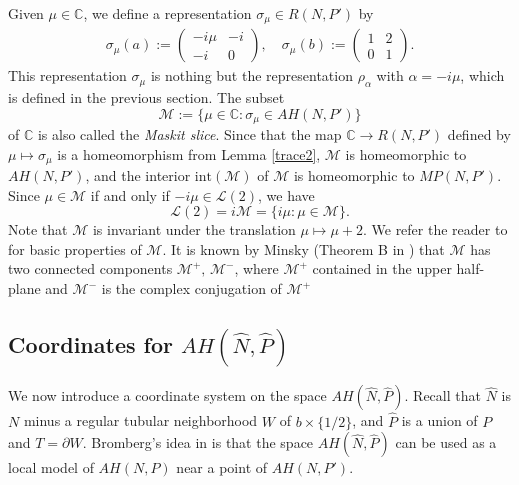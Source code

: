 \documentclass[12pt]{article}
\theoremstyle{plain}
\theoremstyle{definition}
\theoremstyle{remark}
\newcommand{\C}{\mathbb C}
\newcommand{\M}{\mathcal M}
\newcommand{\LL}{\mathcal L}
\newcommand{\hN}{{\hat N}}
\newcommand{\hP}{{\hat P}}
\newcommand{\alp}{\alpha}
\newcommand{\bd}{\partial}
\newcommand{\inte}{\mathrm{int}}
\begin{document}
Given $\mu \in \C$,  we define a representation $\sigma_\mu  \in R(N,P')$ by 
\begin{eqnarray*}
 \sigma_{\mu}(a):=\left(\begin{array}{cc}
 -i\mu & -i \\ 
-i & 
0 \end{array}\right), \quad 
\sigma_{\mu}(b):=\left(\begin{array}{cc}
  1& 2 \\ 
0 & 1
 \end{array}\right). 
\end{eqnarray*}
This representation $\sigma_\mu$ is nothing but the representation $\rho_\alp$ with $\alp=-i\mu$,  
which is defined in the previous section. 
The subset 
$$
\M:=\{\mu \in \C : \sigma_\mu \in AH(N,P')\} 
$$
of $\C$ is also called the {\it Maskit slice}. 
Since  that the map 
$\C \to R(N,P')$ defined by $\mu \mapsto \sigma_\mu$ is a homeomorphism from Lemma \ref{trace2}, 
$\M$ is homeomorphic to $AH(N,P')$, and 
the interior $\inte(\M)$ of $\M$ is homeomorphic to $MP(N,P')$.  
Since $\mu \in \M$ if and only if $-i\mu \in \LL(2)$, we have  
$$
\LL(2)=i\M=\{i \mu : \mu \in \M\}.
$$
Note that  $\M$ is invariant under the translation $\mu \mapsto \mu+2$. 
We refer the reader to \cite{KS} for basic properties of $\M$. 
It is known by Minsky (Theorem B in \cite{Mi}) that $\M$
has two connected components $\M^+, \,\M^-$, 
where $\M^+$ contained in the upper half-plane and $\M^-$ is the complex conjugation of $\M^+$ 




\subsection{Coordinates for $AH(\hN,\hP)$}

We now introduce a coordinate system on the space $AH(\hN,\hP)$. 
Recall that  
$\hat N$ is $N$ minus a regular tubular neighborhood $W$ of $b \times \{1/2\}$,  and 
$\hat P$ is a union of $P$ and  $T=\bd W$. 
Bromberg's idea in \cite{Br} is that the space $AH(\hN,\hP)$ can be used as a local model of $AH(N,P)$ 
near a point of $AH(N,P')$. 
\end{document}
